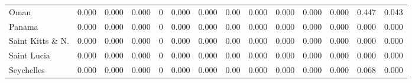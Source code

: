 \begin{table}
\begin{tabular}[t]{lrrrrrrrrrrrrr}
\addlinespace
Oman & 0.000 & 0.000 & 0.000 & 0 & 0.000 & 0.000 & 0.00 & 0.000 & 0.000 & 0.000 & 0.000 & 0.447 & 0.043\\
Panama & 0.000 & 0.000 & 0.000 & 0 & 0.000 & 0.000 & 0.00 & 0.000 & 0.000 & 0.000 & 0.000 & 0.000 & 0.000\\
Saint Kitts \& N. & 0.000 & 0.000 & 0.000 & 0 & 0.000 & 0.000 & 0.00 & 0.000 & 0.000 & 0.000 & 0.000 & 0.000 & 0.000\\
Saint Lucia & 0.000 & 0.000 & 0.000 & 0 & 0.000 & 0.000 & 0.00 & 0.000 & 0.000 & 0.000 & 0.000 & 0.000 & 0.000\\
Seychelles & 0.000 & 0.000 & 0.000 & 0 & 0.000 & 0.000 & 0.00 & 0.000 & 0.000 & 0.000 & 0.000 & 0.068 & 0.000\\
\bottomrule
\end{tabular}
\end{table}